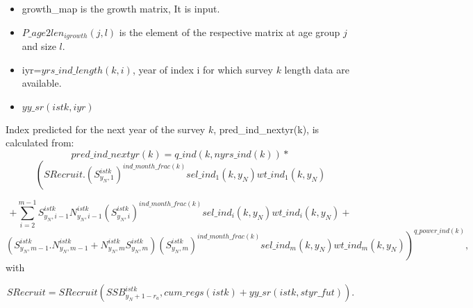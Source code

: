 \documentclass{article}
\begin{document}
\begin{itemize}

    \item growth\_map is the growth matrix, It is input. %
    \item $P\_age2len_{igrowth}(j,l)$ is the element of the respective matrix at age group $j$ and size $l$.
    \item iyr=$yrs\_ind\_length(k,i)$, year of index i for which survey $k$ length data are available.
    
    \item $yy\_sr(istk,iyr)$ 
    \end{itemize}
    
Index predicted for the next year of the survey $k$, pred\_ind\_nextyr(k), is calculated from:
\begin{equation}
    pred\_ind\_nextyr(k)=q\_ind(k,nyrs\_ind(k)) * 
\end{equation}
\begin{equation*}
    \left( SRecruit. {\left(S^{istk}_{y_N,1}\right)}^{ind\_month\_frac(k)} sel\_ind_1(k,y_N)  wt\_ind_1(k,y_N)\right.
\end{equation*}


\begin{equation}
+\sum_{i=2}^{m-1}S^{istk}_{y_N,i-1}N^{istk}_{y_N,i-1}{\left(S^{istk}_{y_N,i}\right)}^{ind\_month\_frac(k)} sel\_ind_i(k,y_N)  wt\_ind_i(k,y_N)+
\end{equation}
\begin{equation*}
  \left. (S^{istk}_{y_N,m-1}.N^{istk}_{y_N,m-1}+N^{istk}_{y_N,m}S^{istk}_{y_N,m}){\left(S^{istk}_{y_N,m}\right)}^{ind\_month\_frac(k)} sel\_ind_m(k,y_N)  wt\_ind_m(k,y_N) \right)^{q\_power\_ind(k)},
\end{equation*}
with

\begin{equation}
    SRecruit=SRecruit(SSB^{istk}_{y_N+1-r_a},cum\_regs(istk)+yy\_sr(istk,styr\_fut)).
\end{equation}
\end{document}
